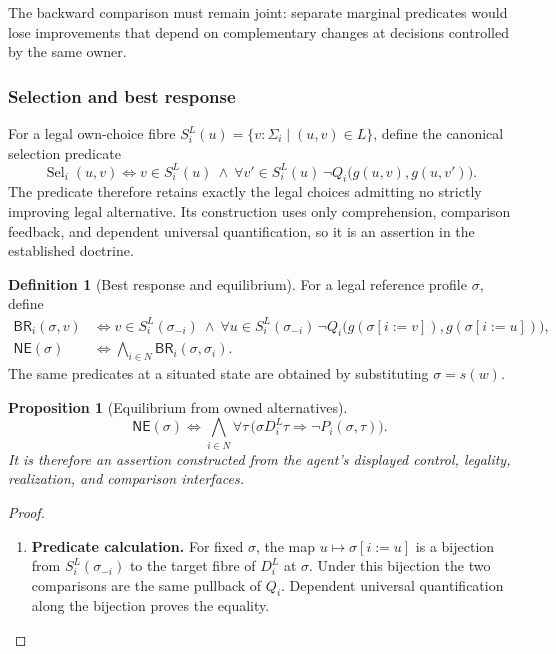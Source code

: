 \documentclass[11pt,a4paper]{article}
\numberwithin{equation}{section}
\newtheorem{proposition}[theorem]{Proposition}
\theoremstyle{definition}
\newtheorem{definition}[theorem]{Definition}
\theoremstyle{remark}
\theoremstyle{plain}
\providecommand{\BR}{\mathsf{BR}}
\providecommand{\NE}{\mathsf{NE}}
\begin{document}
The backward comparison must remain joint: separate marginal
predicates would lose improvements that depend on complementary changes
at decisions controlled by the same owner.

\subsubsection{Selection and best response}

For a legal own-choice fibre
$S_i^L(u)=\{v:\Sigma_i\mid(u,v)\in L\}$, define the canonical selection
predicate
\[
 \operatorname{Sel}_i(u,v)
 \iff v\in S_i^L(u)\ \wedge\
 \forall v'\in S_i^L(u)\,
       \neg Q_i\bigl(g(u,v),g(u,v')\bigr).
\]
The predicate therefore retains exactly the legal choices admitting
no strictly improving legal alternative. Its construction uses only
comprehension, comparison feedback, and dependent universal
quantification, so it is an assertion in the established doctrine.

\begin{definition}[Best response and equilibrium]
For a legal reference profile $\sigma$, define
\begin{align*}
 \BR_i(\sigma,v)
 &\iff v\in S_i^L(\sigma_{-i})\ \wedge\
   \forall u\in S_i^L(\sigma_{-i})\,
   \neg Q_i\bigl(g(\sigma[i:=v]),g(\sigma[i:=u])\bigr),\\
 \NE(\sigma)
 &\iff\bigwedge_{i\in N}\BR_i(\sigma,\sigma_i).
\end{align*}
The same predicates at a situated state are obtained by substituting
$\sigma=s(w)$.
\end{definition}

\begin{proposition}[Equilibrium from owned alternatives]
\label{agt-prop-equilibrium}
\[
 \NE(\sigma)\iff
 \bigwedge_{i\in N}\forall\tau\,
 \bigl(\sigma D_i^L\tau\Rightarrow\neg P_i(\sigma,\tau)\bigr).
\]
It is therefore an assertion constructed from the agent's displayed control,
legality, realization, and comparison interfaces.
\end{proposition}
\begin{proof}
\leavevmode
\begin{enumerate}[label=\textup{(\arabic*)},leftmargin=*,itemsep=4pt,topsep=3pt]
  \item \textbf{Predicate calculation.} For fixed $\sigma$, the map $u\mapsto\sigma[i:=u]$ is a bijection from
$S_i^L(\sigma_{-i})$ to the target fibre of $D_i^L$ at $\sigma$. Under this bijection the two comparisons are the same pullback of $Q_i$. Dependent universal quantification along the bijection proves the equality.
\end{enumerate}
\end{proof}
\end{document}
